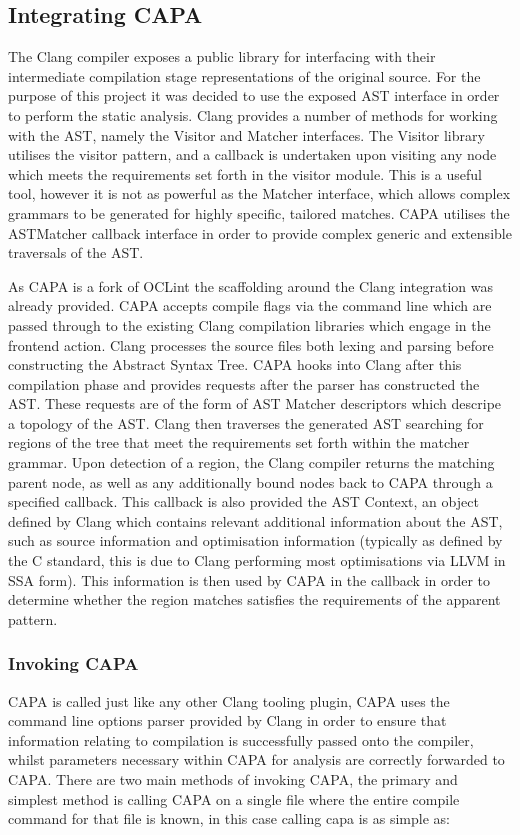 \subsection{Integrating CAPA}\label{integrating_capa}
The Clang compiler exposes a public library for interfacing with their intermediate
compilation stage representations of the original source. For the purpose of this project it was
decided to use the exposed AST interface in order to perform the static analysis. Clang provides a
number of methods for working with the AST, namely the Visitor and Matcher interfaces. The Visitor
library utilises the visitor pattern, and a callback is undertaken upon visiting any node which
meets the requirements set forth in the visitor module. This is a useful tool, however it is not as
powerful as the Matcher interface, which allows complex grammars to be generated for highly
specific, tailored matches. CAPA utilises the ASTMatcher callback interface in order to provide complex
generic and extensible traversals of the AST. 


As CAPA is a fork of OCLint \cite{oclint} the scaffolding around the Clang integration was already
provided. CAPA accepts compile flags via the command line which are passed through to the existing
Clang compilation libraries which engage in the frontend action. Clang processes the source files
both lexing and parsing before constructing the Abstract Syntax Tree. CAPA hooks into Clang after
this compilation phase and provides requests after the parser has constructed the AST. These
requests are of the form of AST Matcher descriptors which descripe a topology of the AST. Clang then
traverses the generated AST searching for regions of the tree that meet the requirements set forth
within the matcher grammar. Upon detection of a region, the Clang compiler returns the matching
parent node, as well as any additionally bound nodes back to CAPA through a specified callback. This
callback is also provided the AST Context, an object defined by Clang which contains relevant
additional information about the AST, such as source information and optimisation information
(typically as defined by the C standard, this is due to Clang performing most optimisations via LLVM
in SSA form). This information is then used by CAPA in the callback in order to determine whether
the region matches satisfies the requirements of the apparent pattern.

\subsubsection{Invoking CAPA}
CAPA is called just like any other Clang tooling plugin, CAPA uses the command line options parser
provided by Clang in order to ensure that information relating to compilation is successfully passed
onto the compiler, whilst parameters necessary within CAPA for analysis are correctly forwarded to
CAPA. There are two main methods of invoking CAPA, the primary and simplest method is calling CAPA
on a single file where the entire compile command for that file is known, in this case calling capa
is as simple as:

